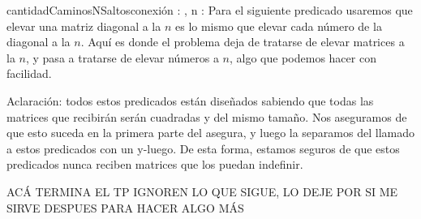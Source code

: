 \documentclass[10pt,a4paper]{article}
\begin{document}
\begin{proc}{cantidadCaminosNSaltos}{\Inout conexi\'on : \TLista{\TLista{\ent}}, \In n : \ent}{}
			\vspace{0.3cm}
			Para el siguiente predicado usaremos que elevar una matriz diagonal a la $n$ es lo mismo que elevar cada n\'umero 
			de la diagonal a la $n$. Aqu\'i es donde el problema deja de tratarse de elevar matrices a la $n$, y pasa a 
			tratarse de elevar n\'umeros a $n$, algo que podemos hacer con facilidad.
			
			{}
			
			{}
			
			{}
			
			\vspace{0.3cm}
			Aclaraci\'on: todos estos predicados est\'an diseñados sabiendo que todas las matrices que recibirán serán cuadradas y del mismo tamaño.
			Nos aseguramos de que esto suceda en la primera parte del asegura, y luego la separamos del llamado a estos predicados con un y-luego. De esta forma, estamos seguros de que 
			estos predicados nunca reciben matrices que los puedan indefinir.
		\end{proc}
	


\vspace{4cm}
	ACÁ TERMINA EL TP IGNOREN LO QUE SIGUE, LO DEJE POR SI ME SIRVE DESPUES PARA HACER ALGO MÁS 
	
	\vspace{4cm}
\end{document}
